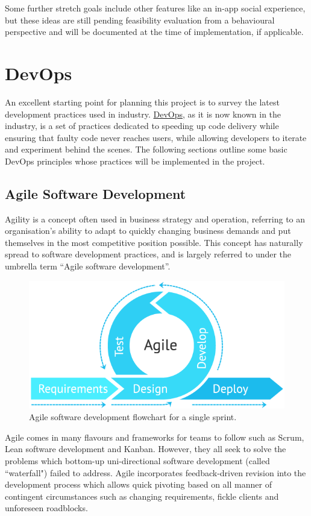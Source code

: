 Some further stretch goals include other features like an in-app social experience, but these ideas are still pending feasibility evaluation from a behavioural perspective and will be documented at the time of implementation, if applicable.

\section{DevOps}
An excellent starting point for planning this project is to survey the latest development practices used in industry. \href{https://aws.amazon.com/devops/what-is-devops/}{DevOps}, as it is now known in the industry, is a set of practices dedicated to speeding up code delivery while ensuring that faulty code never reaches users, while allowing developers to iterate and experiment behind the scenes. The following sections outline some basic DevOps principles whose practices will be implemented in the project.

\subsection{Agile Software Development}
Agility is a concept often used in business strategy and operation, referring to an organisation's ability to adapt to quickly changing business demands and put themselves in the most competitive position possible. This concept has naturally spread to software development practices, and is largely referred to under the umbrella term ``Agile software development''.

\begin{figure}[h]
    \begin{center}
        \includegraphics[width=0.6\linewidth]{images/methodology-agile.png}
    \end{center}
    \caption{Agile software development flowchart for a single sprint.}
    \label{fig:agile_flow}
\end{figure}

Agile comes in many flavours and frameworks for teams to follow such as Scrum, Lean software development and Kanban. However, they all seek to solve the problems which bottom-up uni-directional software development (called ``waterfall") failed to address. Agile incorporates feedback-driven revision into the development process which allows quick pivoting based on all manner of contingent circumstances such as changing requirements, fickle clients and unforeseen roadblocks.

